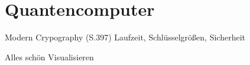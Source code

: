 \chapter{Quantencomputer}
Modern Crypography (S.397)
Laufzeit, Schlüsselgrößen, Sicherheit

Alles schön Visualisieren
